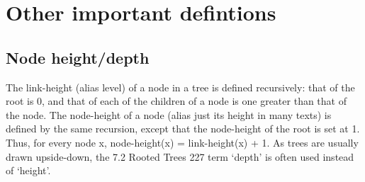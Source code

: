 \documentclass[a5paper]{article}
\begin{document}
\section*{Other important defintions}
\subsection*{Node height/depth}
The link-height (alias level) of a node in a tree is defined recursively: that of the root
is 0, and that of each of the children of a node is one greater than that of the node.
The node-height of a node (alias just its height in many texts) is defined by the same
recursion, except that the node-height of the root is set at 1. Thus, for every node x,
node-height(x) = link-height(x) + 1. As trees are usually drawn upside-down, the
7.2 Rooted Trees 227
term ‘depth’ is often used instead of ‘height’.
\end{document}
